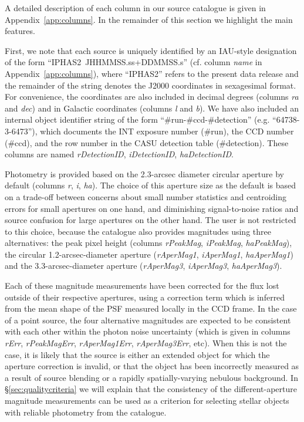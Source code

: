 \documentclass[useAMS,usenatbib]{mn2e}
\begin{document}
A detailed description of each column in our source catalogue
is given in Appendix~\ref{app:columns}.
In the remainder of this section we highlight the main features.

First, we note that each source is uniquely identified by an
IAU-style designation of the form ``IPHAS2\ JHHMMSS.ss+DDMMSS.s''
(cf. column \emph{name} in Appendix~\ref{app:columns}),
where ``IPHAS2'' refers to the present
data release and the remainder of the string
denotes the J2000 coordinates in sexagesimal format.
For convenience, the coordinates
are also included in decimal degrees
(columns \emph{ra} and \emph{dec})
and in Galactic coordinates
(columns \emph{l} and \emph{b}).
We have also included an internal object identifier string 
of the form ``\#run-\#ccd-\#detection''
(e.g. ``64738-3-6473''),
which documents the INT exposure number (\#run),
the CCD number (\#ccd),
and the row number in the CASU detection table (\#detection).
These columns are named \emph{rDetectionID},
\emph{iDetectionID}, \emph{haDetectionID}.

Photometry is provided based on the 2.3-arcsec diameter circular aperture
by default (columns \emph{r}, \emph{i}, \emph{ha}).
The choice of this aperture size as the default 
is based on a trade-off between concerns 
about small number statistics and centroiding errors
for small apertures on one hand,
and diminishing signal-to-noise ratios and source confusion
for large apertures on the other hand.
The user is not restricted to this choice, because
the catalogue also provides magnitudes
using three alternatives:
the peak pixel height 
(columns \emph{rPeakMag}, \emph{iPeakMag}, \emph{haPeakMag}),
the circular 1.2-arcsec-diameter aperture 
(\emph{rAperMag1}, \emph{iAperMag1},
 \emph{haAperMag1}) and
the 3.3-arcsec-diameter aperture 
(\emph{rAperMag3}, \emph{iAperMag3},
 \emph{haAperMag3}).

Each of these magnitude measurements have been
corrected for the flux lost outside of their respective apertures,
using a correction term which is inferred from the
mean shape of the PSF measured locally in the CCD frame.
In the case of a point source,
the four alternative magnitudes are expected
to be consistent with each other
within the photon noise uncertainty
(which is given in columns \emph{rErr}, \emph{rPeakMagErr},
\emph{rAperMag1Err}, \emph{rAperMag3Err}, etc).
When this is not the case,
it is likely that the source is either
an extended object for which the aperture correction is invalid,
or that the object has been incorrectly measured as a result of
source blending or a rapidly spatially-varying nebulous background.
In \S\ref{sec:qualitycriteria} we will explain that the consistency
of the different-aperture magnitude measurements
can be used as a criterion for selecting stellar objects
with reliable photometry from the catalogue.
\end{document}
